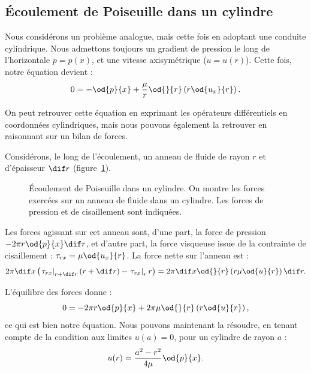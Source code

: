 \subsection{Écoulement de Poiseuille dans un cylindre}
\label{sec:poiseuille_cylindre}

Nous considérons un problème analogue, mais cette fois en adoptant une conduite cylindrique. Nous admettons toujours un gradient de pression le long de l'horizontale $p = p(x)$, et une vitesse axisymétrique ($u = u(r)$). Cette fois, notre équation devient :
\begin{displaymath}
  0 = -\od{p}{x} + \frac{\mu}{r} \od{}{r}\left( r \od{u_x}{r}\right).
\end{displaymath}

On peut retrouver cette équation en exprimant les opérateurs différentiels en coordonnées cylindriques, mais nous pouvons également la retrouver en raisonnant sur un bilan de forces.

Considérons, le long de l'écoulement, un anneau de fluide de rayon $r$ et d'épaisseur $\dif r$ (figure~\ref{fig:anneau_cylindre}).

\begin{figure}[h]
  
  \caption{Écoulement de Poiseuille dans un cylindre. On montre les forces exercées sur un anneau de fluide dans un cylindre. Les forces de pression et de cisaillement sont indiquées.}
  \label{fig:anneau_cylindre}
\end{figure}

Les forces agissant sur cet anneau sont, d'une part, la force de pression $-2\pi r \od{p}{x} \dif r$, et d'autre part, la force visqueuse issue de la contrainte de cisaillement : $\tau_{rx} = \mu \od{u_x}{r}$. La force nette sur l'anneau est :
\begin{displaymath}
  2\pi \dif x \left( \left.\tau_{rx}\right|_{r+\dif r}(r + \dif r) - \left.\tau_{rx}\right|_{r} r \right) = 2\pi \dif x \od{}{r}\left( r \mu \od{u}{r}\right) \dif r.
\end{displaymath}

L'équilibre des forces donne :
\begin{displaymath}
  0 = -2\pi r \od{p}{x} + 2\pi \mu \od{}{r}\left( r \od{u}{r}\right),
\end{displaymath}
ce qui est bien notre équation. Nous pouvons maintenant la résoudre, en tenant compte de la condition aux limites $u(a) = 0$, pour un cylindre de rayon $a$ :
\begin{displaymath}
  u(r) = \frac{a^2 - r^2}{4\mu} \od{p}{x}.
\end{displaymath}

